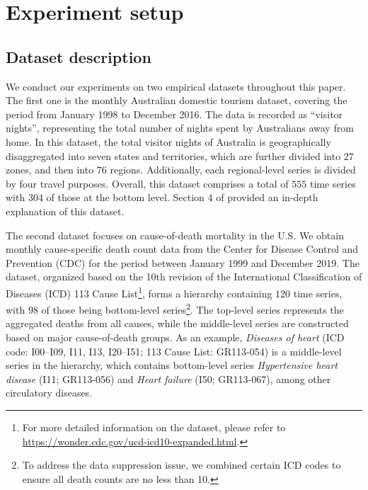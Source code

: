 \documentclass[a4paper,review,12pt,authoryear]{elsarticle}
\begin{document}
\section{Experiment setup}\label{sec:setup}

\subsection{Dataset description}

We conduct our experiments on two empirical datasets throughout this paper. The first one is the monthly Australian domestic tourism dataset, covering the period from January 1998 to December 2016. The data is recorded as ``visitor nights'', representing the total number of nights spent by Australians away from home. In this dataset, the total visitor nights of Australia is geographically disaggregated into seven states and territories, which are further divided into $27$ zones, and then into $76$ regions. Additionally, each regional-level series is divided by four travel purposes. Overall, this dataset comprises a total of $555$ time series with $304$ of those at the bottom level.
Section 4 of \cite{wickramasuriyaOptimalForecastReconciliation2019} provided an in-depth explanation of this dataset.

The second dataset focuses on cause-of-death mortality in the U.S. We obtain monthly cause-specific death count data from the Center for Disease Control and Prevention (CDC) for the period between January 1999 and December 2019. The dataset, organized based on the 10th revision of the International Classification of Diseases (ICD) 113 Cause List\footnote{For more detailed information on the dataset, please refer to \url{https://wonder.cdc.gov/ucd-icd10-expanded.html}.}, forms a hierarchy containing $120$ time series, with $98$ of those being bottom-level series\footnote{To address the data suppression issue, we combined certain ICD codes to ensure all death counts are no less than 10. }. The top-level series represents the aggregated deaths from all causes, while the middle-level series are constructed based on major cause-of-death groups. As an example, \textit{Diseases of heart} (ICD code: I00--I09, I11, I13, I20--I51; 113 Cause List: GR113-054) is a middle-level series in the hierarchy, which contains bottom-level series \textit{Hypertensive heart disease} (I11; GR113-056) and \textit{Heart failure} (I50; GR113-067), among other circulatory diseases.  %
\end{document}

